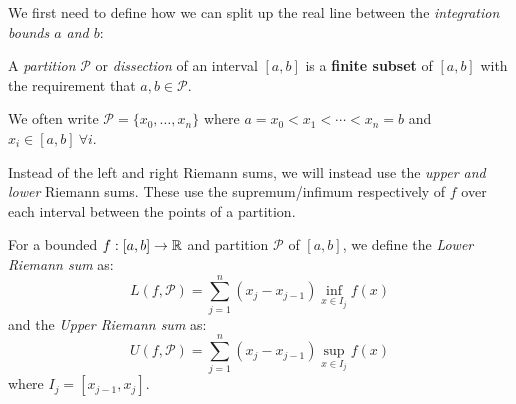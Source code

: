 \documentclass[../main.tex]{subfiles}
\begin{document}
\begin{center}
\end{center}
We first need to define how we can split up the real line between the \textit{integration bounds $a$ and $b$}:
\begin{definition}
  A \textit{partition} $\mathcal{P}$ or \textit{dissection} of an interval $[a, b]$ is a \textbf{finite subset} of $[a, b]$ with the requirement that $a, b \in \mathcal{P}$.

  We often write $\mathcal{P} = \{x_0, \ldots, x_n\}$ where $a = x_0 < x_1 < \cdots < x_n = b$ and $x_i \in [a, b]\ \forall i$.
\end{definition}
Instead of the left and right Riemann sums, we will instead use the \textit{upper and lower} Riemann sums.
These use the supremum/infimum respectively of $f$ over each interval between the points of a partition.
\begin{definition}
  For a bounded $f: [a, b] \to \mathbb{R}$ and partition $\mathcal{P}$ of $[a, b]$, we define the \textit{Lower Riemann sum} as:
  \[
    L(f, \mathcal{P}) = \sum_{j = 1}^{n} (x_j - x_{j - 1}) \inf_{x \in I_j} f(x)
  \]
  and the \textit{Upper Riemann sum} as:
  \[
    U(f, \mathcal{P}) = \sum_{j = 1}^{n} (x_j - x_{j - 1}) \sup_{x \in I_j} f(x)
  \]
  where $I_j = [x_{j - 1}, x_{j}]$.
\end{definition}
\end{document}
